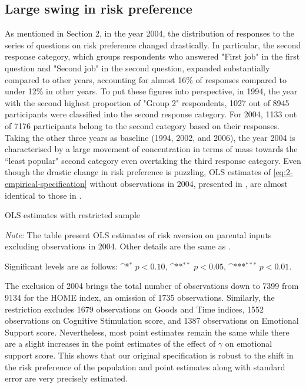 \documentclass[]{article}
\begin{document}
\subsection{Large swing in risk preference}
As mentioned in Section 2, in the year 2004, the distribution of responses to the series of questions on risk preference changed drastically. In particular, the second response category, which groups respondents who answered "First job" in the first question and "Second job" in the second question, expanded substantially compared to other years, accounting for almost 16\% of responses compared to under 12\% in other years. To put these figures into perspective, in 1994, the year with the second highest proportion of "Group 2" respondents, 1027 out of 8945 participants were classified into the second response category. For 2004, 1133 out of 7176 participants belong to the second category based on their responses. Taking the other three years as baseline (1994, 2002, and 2006), the year 2004 is characterised by a large movement of concentration in terms of mass towards the ``least popular" second category even overtaking the third response category. Even though the drastic change in risk preference is puzzling, OLS estimates of \eqref{eq:2-empirical-specification} without observations in 2004, presented in , are almost identical to those in . 

\begin{table}[!h]
	\centering
	\begin{threeparttable}
		\def\sym#1{\ifmmode^{#1}\else\(^{#1}\)\fi}
		\caption{OLS estimates with restricted sample}	
		
		\label{table:7-robust-1}
		\begin{tablenotes}[flushleft] \footnotesize
			\item \textit{Note:} The table present OLS estimates of risk aversion on parental inputs excluding observations in 2004. Other details are the same as .
			\item Significant levels are as follows: \sym{*} \(p<0.10\), \sym{**} \(p<0.05\), \sym{***} \(p<0.01\).
		\end{tablenotes}
	\end{threeparttable}
\end{table}

The exclusion of 2004 brings the total number of observations down to 7399 from 9134 for the HOME index, an omission of 1735 observations. Similarly, the restriction excludes 1679 observations on Goods and Time indices, 1552 observations on Cognitive Stimulation score, and 1387 observations on Emotional Support score. Nevertheless, most point estimates remain the same while there are a slight increases in the point estimates of the effect of $\gamma$ on emotional support score. This shows that our original specification is robust to the shift in the risk preference of the population and point estimates along with standard error are very precisely estimated. 
\end{document}
